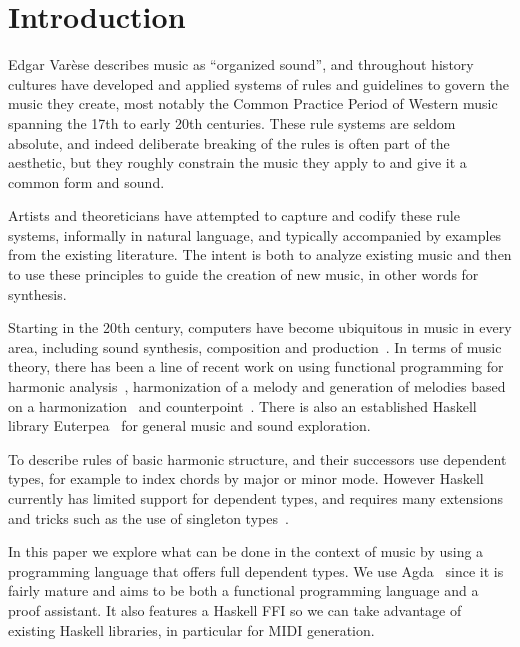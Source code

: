 \section{Introduction}
\label{sec:intro}

Edgar Var\`{e}se describes music as ``organized sound'', and
throughout history cultures have developed and applied systems of rules
and guidelines to govern the music they create, most notably the
Common Practice Period of Western music spanning the 17th to early
20th centuries. These rule systems are seldom absolute, and indeed
deliberate breaking of the rules is often part of the aesthetic, but they
roughly constrain the music they apply to and
give it a common form and sound.

Artists and theoreticians have attempted to capture and codify these
rule systems, informally in natural language, and typically
accompanied by examples from the existing literature. The intent is
both to analyze existing music and then to use these principles to
guide the creation of new music, in other words for synthesis.

Starting in the 20th century, computers have become ubiquitous in
music in every area, including sound synthesis, composition and
production~\citep{roads-tutorial}. In terms of music theory, there has
been a line of recent work on using functional programming for
harmonic
analysis~\citep{magalhaes-harmtrace,dehaas-harmtrace-a,dehaas-harmtrace-b},
harmonization of a melody and generation of melodies based on a
harmonization~\citep{koops-fharm,magalhaes-fcomp} and
counterpoint~\citep{szamozvancev-welltyped}. There is also an
established Haskell library Euterpea~\citep{hudak-haskell} for general music
and sound exploration.

To describe rules of basic harmonic structure,
\citet{magalhaes-harmtrace} and their successors use dependent types,
for example to index chords by major or minor mode.  However Haskell
currently has limited support for dependent types, and requires many
extensions and tricks such as the use of singleton
types~\citep{eisenberg-singleton}.

In this paper we explore what can be done in the context of music by
using a programming language that offers full dependent types. We use
Agda~\citep{norell-phd} since it is fairly mature and
aims to be both a functional programming language and a proof
assistant. It also features a Haskell FFI so we can take advantage of
existing Haskell libraries, in particular for MIDI generation.

